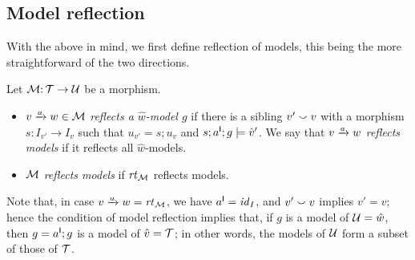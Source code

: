 \subsection{Model reflection}

With the above in mind, we first define reflection of models, this being the more straightforward of the two directions.

\begin{definition}
Let ${\mathcal{M}}{:}\, {\mathcal{T}}\rightarrow{\mathcal{U}}$ be a morphism.
\begin{itemize}[topsep=\itemsep]
\item $\trip vaw\in\cM$ \emph{reflects a $\hat w$-model $g$} if there is a sibling $v'\smallsmile v$ with a morphism $s:I_{v'}\to I_v$ such that $u_{v'}=s;u_v$ and $s;a^{\mathsf I};g\models \hat v'$. We say that $\trip vaw$ \emph{reflects models} if it reflects all $\hat w$-models.

\item ${\mathcal{M}}$ \emph{reflects models} if $\mathit{rt}_{{\mathcal{M}}}$ reflects models.
\end{itemize}
\end{definition}
%
Note that, in case $\trip vaw=\rt\cM$, we have $a^{\mathsf I}={\mathit{id}}_I$, and $v'\smallsmile v$ implies $v'=v$; hence the condition of model reflection implies that, if $g$ is a model of ${\mathcal{U}}=\hat w$, then $g=a^{\mathsf I};g$ is a model of $\hat v={\mathcal{T}}$; in other words, the models of ${\mathcal{U}}$ form a subset of those of ${\mathcal{T}}$.

